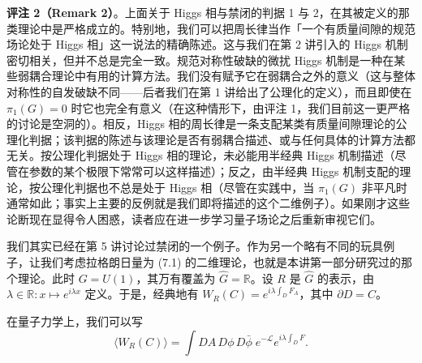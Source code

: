\textbf{评注 2（Remark 2）}。上面关于 Higgs 相与禁闭的判据 1 与 2，在其被定义的那类理论中是严格成立的。特别地，我们可以把周长律当作「一个有质量间隙的规范场论处于 Higgs 相」这一说法的精确陈述。这与我们在第 2 讲引入的 Higgs 机制密切相关，但并不总是完全一致。规范对称性破缺的微扰 Higgs 机制是一种在某些弱耦合理论中有用的计算方法。我们没有赋予它在弱耦合之外的意义（这与整体对称性的自发破缺不同——后者我们在第 1 讲给出了公理化的定义），而且即使在 $\pi_1(G)=0$ 时它也完全有意义（在这种情形下，由评注 1，我们目前这一更严格的讨论是空洞的）。相反，Higgs 相的周长律是一条支配某类有质量间隙理论的公理化判据；该判据的陈述与该理论是否有弱耦合描述、或与任何具体的计算方法都无关。按公理化判据处于 Higgs 相的理论，未必能用半经典 Higgs 机制描述（尽管在参数的某个极限下常常可以这样描述）；反之，由半经典 Higgs 机制支配的理论，按公理化判据也不总是处于 Higgs 相（尽管在实践中，当 $\pi_1(G)$ 非平凡时通常如此；事实上主要的反例就是我们即将描述的这个二维例子）。如果刚才这些论断现在显得令人困惑，读者应在进一步学习量子场论之后重新审视它们。

我们其实已经在第 5 讲讨论过禁闭的一个例子。作为另一个略有不同的玩具例子，让我们考虑拉格朗日量为 (7.1) 的二维理论，也就是本讲第一部分研究过的那个理论。此时 $G=U(1)$，其万有覆盖为 $\widehat{G}=\mathbb{R}$。设 $R$ 是 $\widehat{G}$ 的表示，由 $\lambda\in\mathbb{R}:x\mapsto e^{i\lambda x}$ 定义。于是，经典地有 $W_R(C)=e^{i\lambda\int_D F_A}$，其中 $\partial D=C$。


在量子力学上，我们可以写
\begin{equation}
  \tag{7.16}
  \label{eq:7-16}
  \langle W_R(C)\rangle=\int DA\,D\phi\,D\bar\phi\;e^{-\mathcal{L}}e^{i\lambda\int_D F} .
\end{equation}


